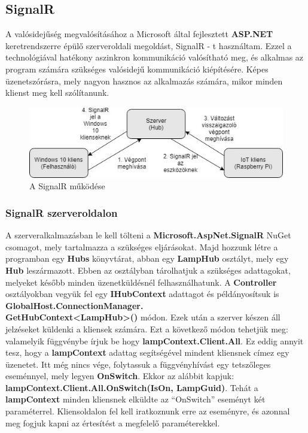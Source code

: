\documentclass[a4paper,12pt]{report}
\begin{document}
\subsection{SignalR}
    A valósidejűség megvalósításához a Microsoft által fejlesztett \textbf{ASP.NET} keretrendszerre épülő szerveroldali megoldást,
    SignalR - t használtam. Ezzel a technológiával hatékony aszinkron kommunikáció valósítható meg, és alkalmas az program számára
    szükséges valósidejű kommunikáció kiépítésére. Képes üzenetszórásra, mely nagyon hasznos az alkalmazás számára, mikor minden klienst
    meg kell szólítanunk.\\

\begin{figure}[H]
    \centering
    \includegraphics[width=\linewidth]{images/signalr.jpg}
    \caption{A SignalR működése}
    \label{fig: SignalR}
\end{figure}

\subsubsection{SignalR szerveroldalon}
    A szerveralkalmazásban le kell tölteni a \textbf{Microsoft.AspNet.SignalR} NuGet csomagot, mely tartalmazza a szükséges eljárásokat.
    Majd hozzunk létre a programban egy \textbf{Hubs} könyvtárat, abban egy \textbf{LampHub} osztályt, mely egy \textbf{Hub} leszármazott.
    Ebben az osztályban tárolhatjuk a szükséges adattagokat, melyeket később minden üzenetküldésnél felhasználhatunk. A \textbf{Controller}
    osztályokban vegyük fel egy \textbf{IHubContext} adattagot és példányosítsuk is \textbf{GlobalHost.ConnectionManager.\\GetHubContext<LampHub>()}
    módon. Ezek után a szerver készen áll jelzéseket küldenki a kliensek számára. Ezt a következő módon tehetjük meg: valamelyik függvénybe
    írjuk be hogy \textbf{lampContext.Client.All}. Ez eddig annyit tesz, hogy a \textbf{lampContext} adattag segítségével mindent kliensnek címez
    egy üzenetet. Itt még nincs vége, folytassuk a függvényhívást egy tetszőleges eseménnyel, mely legyen \textbf{OnSwitch}. Ekkor az alábbit kapjuk:
    \textbf{lampContext.Client.All.OnSwitch(IsOn, LampGuid)}. Tehát a \textbf{lampContext} minden kliensnek elküldte az ``OnSwitch'' eseményt két paraméterrel.
    Kliensoldalon fel kell iratkoznunk erre az eseményre, és azonnal meg fogjuk kapni az értesítést a megfelelő paraméterekkel.
\end{document}
